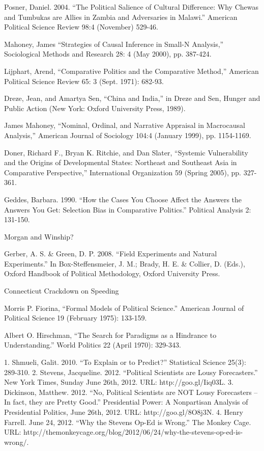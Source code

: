 \documentclass[12pt,a4paper]{article}
\begin{document}
Posner, Daniel. 2004. “The Political Salience of Cultural Difference: Why Chewas and Tumbukas are Allies in Zambia and Adversaries in Malawi.” American Political Science Review 98:4 (November) 529-46.

Mahoney, James “Strategies of Causal Inference in Small-N Analysis,” Sociological Methods and Research 28: 4 (May 2000), pp. 387-424.

Lijphart, Arend, “Comparative Politics and the Comparative Method,” American Political Science Review 65: 3 (Sept. 1971): 682-93.

Dreze, Jean, and Amartya Sen, “China and India,” in Dreze and Sen, Hunger and Public Action (New York: Oxford University Press, 1989).

James Mahoney, “Nominal, Ordinal, and Narrative Appraisal in Macrocausal Analysis,” American Journal of Sociology 104:4 (January 1999), pp. 1154-1169. 

Doner, Richard F., Bryan K. Ritchie, and Dan Slater, “Systemic Vulnerability and the Origins of Developmental States: Northeast and Southeast Asia in Comparative Perspective,” International Organization 59 (Spring 2005), pp. 327-361.

Geddes, Barbara. 1990. “How the Cases You Choose Affect the Answers the Answers You Get: Selection Bias in Comparative Politics.” Political Analysis 2: 131-150.

Morgan and Winship?

Gerber, A. S. & Green, D. P. 2008. “Field Experiments and Natural Experiments.” In Box-Steffensmeier, J. M.; Brady, H. E. & Collier, D. (Eds.), Oxford Handbook of Political Methodology, Oxford University Press.

Connecticut Crackdown on Speeding





Morris P. Fiorina, “Formal Models of Political Science.” American Journal of Political Science 19 (February 1975): 133-159. 

Albert O. Hirschman, “The Search for Paradigms as a Hindrance to Understanding.” World Politics 22 (April 1970): 329-343.

1. Shmueli, Galit. 2010. “To Explain or to Predict?” Statistical Science 25(3): 289-310.
2. Stevens, Jacqueline. 2012. “Political Scientists are Lousy Forecasters.” New York Times, Sunday June 26th, 2012.
URL: http://goo.gl/Iiq03L.
3. Dickinson, Matthew. 2012. “No, Political Scientists are NOT Lousy Forecasters – In fact, they are Pretty Good.”
Presidential Power: A Nonpartisan Analysis of Presidential Politics, June 26th, 2012. URL: http://goo.gl/8O8j3N.
4. Henry Farrell. June 24, 2012. “Why the Stevens Op-Ed is Wrong.” The Monkey Cage. URL:
http://themonkeycage.org/blog/2012/06/24/why-the-stevens-op-ed-is-wrong/. 
\end{document}
